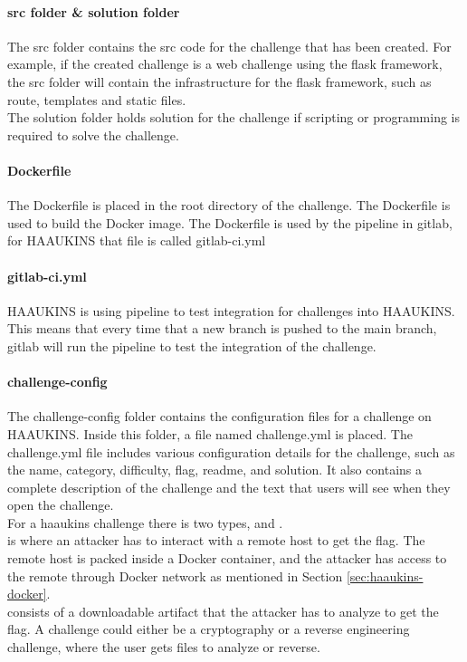 \paragraph{src folder \& solution folder}
The src folder contains the src code for the challenge that has been created. For example, 
if the created challenge is a web challenge using the flask framework, the src folder will contain 
the infrastructure for the flask framework, such as route, templates and static files.\\
The solution folder holds solution for the challenge if scripting or programming is required to solve the challenge.
\paragraph{Dockerfile}
The Dockerfile is placed in the root directory of the challenge. The Dockerfile is used to build the Docker image.
The Dockerfile is used by the pipeline in gitlab, for \ac{HAAUKINS} that file is called gitlab-ci.yml
\paragraph{gitlab-ci.yml}
\ac{HAAUKINS} is using pipeline to test integration for challenges into \ac{HAAUKINS}. This means 
that every time that a new branch is pushed to the main branch, gitlab will run the pipeline to test the integration of the challenge.
\paragraph{challenge-config}
The challenge-config folder contains the configuration files for a challenge on \ac{HAAUKINS}. 
Inside this folder, a file named challenge.yml is placed. The challenge.yml file includes various configuration details for the challenge, 
such as the name, category, difficulty, flag, readme, and solution. 
It also contains a complete description of the challenge and the text that users will see when they open the challenge.\\
For a haaukins challenge there is two types,  and .\\
 is where 
an attacker has to interact with a remote host to get the flag. The remote host is packed inside a Docker container, and the 
attacker has access to the remote through Docker network as mentioned in Section \ref{sec:haaukins-docker}.\\
 consists of a downloadable artifact that the attacker has to analyze to get the flag. 
A challenge could either be a cryptography or a reverse engineering challenge, where the user gets files to analyze or reverse.\cite{haaukins-challenge}


